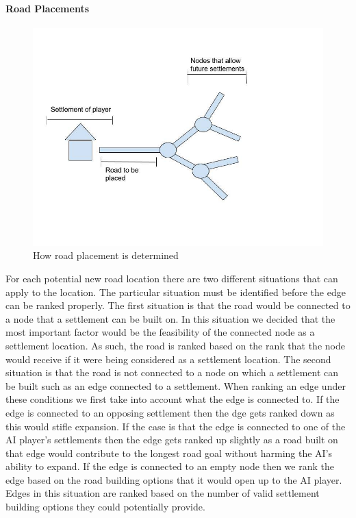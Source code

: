 \documentclass[a4paper,doc]{apa6}
\begin{document}
\paragraph{Road Placements}
\begin{figure}[hbtp]
\includegraphics[width=\textwidth]{AIRoadPlacement}
\caption{How road placement is determined}
\end{figure}
For each potential new road location there are two different situations that can apply to the location. The particular situation must be identified before the edge can be ranked properly.    
 The first situation is that the road would be connected to a node that a settlement can be built on. In this situation we decided that the most important factor would be the feasibility of the connected node as a settlement location. As such, the road is ranked based on the rank that the node would receive if it were being considered as a settlement location.
The second situation is that the road is not connected to a node on which a settlement can be built such as an edge connected to a settlement. When ranking an edge under these conditions we first take into account what the edge is connected to. If the edge is connected to an opposing settlement then the dge gets ranked down as this would stifle expansion. If the case is that the edge is connected to one of the AI player’s settlements then the edge gets ranked up slightly as a road built on that edge would contribute to the longest road goal without harming the AI’s ability to expand.  If the edge is connected to an empty node then we rank the edge based on the road building options that it would open up to the AI player. Edges in this situation are ranked based on the number of valid settlement building options they could potentially provide.
\end{document}
